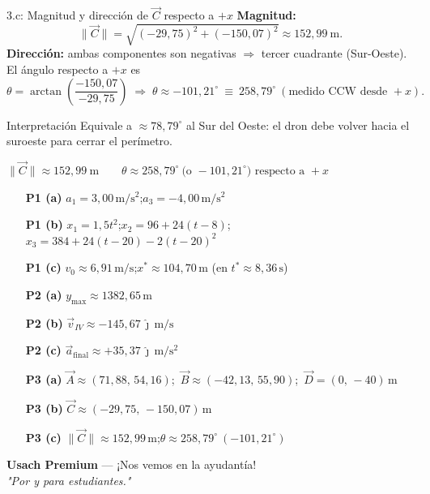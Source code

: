 \documentclass[letterpaper, 11pt]{article}
\begin{document}
\begin{paso}{3.c: Magnitud y direcci\'on de $\vec{C}$ respecto a $+x$}
\textbf{Magnitud:}
\[
\lVert\vec{C}\rVert=\sqrt{(-29{,}75)^2+(-150{,}07)^2}\approx 152{,}99\ \mathrm{m}.
\]
\textbf{Direcci\'on:} ambas componentes son negativas $\Rightarrow$ tercer cuadrante
(Sur-Oeste). El \'angulo respecto a $+x$ es
\[
\theta=\arctan\!\left(\frac{-150{,}07}{-29{,}75}\right)
\;\Rightarrow\;
\theta\approx -101{,}21^\circ\ \equiv\ 258{,}79^\circ\ (\text{medido CCW desde }+x).
\]
\begin{justif}{Interpretaci\'on}
Equivale a $\approx 78{,}79^\circ$ al Sur del Oeste: el dron debe volver hacia el
suroeste para cerrar el per\'imetro.
\end{justif}
\begin{resultado}\centering
$\displaystyle \lVert\vec{C}\rVert\approx 152{,}99\ \mathrm{m}\qquad
\theta\approx 258{,}79^\circ\ \text{(o } -101{,}21^\circ\text{) respecto a }+x$
\end{resultado}
\end{paso}

\begin{tcolorbox}[colback=verdePaso!8, colframe=verdePaso, arc=8pt,
    boxrule=1pt, enhanced, breakable,
    title={\bfseries\color{white} Resumen de resultados},
    colbacktitle=verdePaso, fonttitle=\bfseries]
\small
\begin{itemize}[leftmargin=1.6cm, itemsep=3pt]
\item[\textbf{P1 (a)}] $a_1=3{,}00\,\mathrm{m/s^2}$;\quad $a_3=-4{,}00\,\mathrm{m/s^2}$
\item[\textbf{P1 (b)}] $x_1=1{,}5t^2$;\quad $x_2=96+24(t-8)$;\quad $x_3=384+24(t-20)-2(t-20)^2$
\item[\textbf{P1 (c)}] $v_0\approx 6{,}91\,\mathrm{m/s}$;\quad $x^{*}\approx 104{,}70\,\mathrm{m}$ (en $t^{*}\approx 8{,}36\,\mathrm{s}$)
\item[\textbf{P2 (a)}] $y_{\max}\approx 1382{,}65\,\mathrm{m}$
\item[\textbf{P2 (b)}] $\vec{v}_{IV}\approx -145{,}67\,\hat{\jmath}\,\mathrm{m/s}$
\item[\textbf{P2 (c)}] $\vec{a}_{\mathrm{final}}\approx +35{,}37\,\hat{\jmath}\,\mathrm{m/s^2}$
\item[\textbf{P3 (a)}] $\vec{A}\approx(71{,}88,\,54{,}16)$;\ $\vec{B}\approx(-42{,}13,\,55{,}90)$;\ $\vec{D}=(0,\,-40)\,\mathrm{m}$
\item[\textbf{P3 (b)}] $\vec{C}\approx(-29{,}75,\,-150{,}07)\,\mathrm{m}$
\item[\textbf{P3 (c)}] $\lVert\vec{C}\rVert\approx 152{,}99\,\mathrm{m}$;\quad $\theta\approx 258{,}79^\circ\ (-101{,}21^\circ)$
\end{itemize}
\end{tcolorbox}

\vspace{0.8cm}
\begin{center}
    \small\textbf{Usach Premium} --- ¡Nos vemos en la ayudant\'ia! \\
    \textit{"Por y para estudiantes."}
\end{center}
\end{document}
